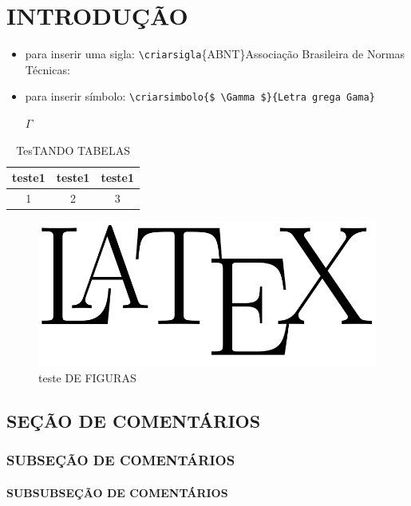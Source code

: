 \chapter[INTRODUÇÃO]{INTRODUÇÃO}



\begin{itemize}
 \item para inserir uma sigla: 
    \verb|\criarsigla|\{ABNT\}{Associa\c{c}\~ao Brasileira de Normas T\'ecnicas}:


\item para inserir s\'imbolo: 
    \verb|\criarsimbolo{$ \Gamma $}{Letra grega Gama}|
  
    $ \Gamma $ 

\end{itemize}


\begin{table}[!ht]
 \centering
 \par\caption{TesTANDO TABELAS}

\begin{tabular}{c|c|c}
 teste1&teste1&teste1\\\hline\hline
  1&2&3\\\hline
 \end{tabular}
 \label{tab:tab01}
\end{table}

\begin{figure}[!ht]
 \centering
  \includegraphics[width=.50\textwidth]{figure}
 
 \caption{teste DE FIGURAS}
 \label{fig:01}
\end{figure}


\section{SEÇÃO DE COMENTÁRIOS}
\subsection{SUBSEÇÃO DE COMENTÁRIOS}
\subsubsection{SUBSUBSEÇÃO DE COMENTÁRIOS}
